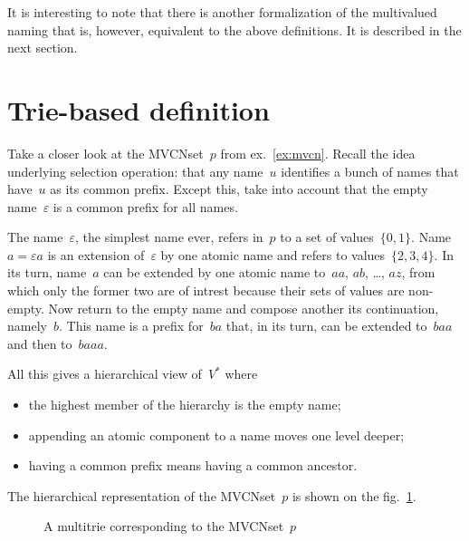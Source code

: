 \documentclass{article}
\theoremstyle{definition}
\begin{document}
It is interesting to note that there is another formalization of the
multivalued naming that is, however, equivalent to the above definitions.  It
is described in the next section.



\section{Trie-based definition}

Take a closer look at the MVCNset~$p$ from ex.~\ref{ex:mvcn}.
Recall the
idea underlying selection operation: that any name~$u$ identifies a bunch of
names that have~$u$ as its common prefix. Except this, take into account that
the empty name~$\varepsilon$ is a common prefix for all names.

The name~$\varepsilon$, the simplest name ever, refers in~$p$ to a set of
values~$\{0,1\}$. Name~$a=\varepsilon a$ is an extension of~$\varepsilon$ by
one atomic name and refers to values~$\{2,3,4\}$. In its turn, name~$a$ can
be extended by one atomic name to~$aa$, $ab$, \ldots, $az$, from which only the
former two are of intrest because their sets of values are non-empty.
Now return to the empty name and compose another its continuation, namely~$b$.
This name is a prefix for~$ba$ that, in its turn, can be extended to~$baa$ and
then to~$baaa$.

All this gives a hierarchical view of~$V^\ast$ where
\begin{itemize}
\item the highest member of the hierarchy is the empty name;
\item appending an atomic component to a name moves one level deeper;
\item having a common prefix means having a common ancestor.
\end{itemize}
The hierarchical representation of the MVCNset~$p$ is shown on the
fig.~\ref{fig:trie}.

\begin{figure}[ht]
\begin{center}
\begin{minipage}{17em}
\end{minipage}
\end{center}
\caption{A multitrie corresponding to the MVCNset~$p$}\label{fig:trie}
\end{figure}
\end{document}
